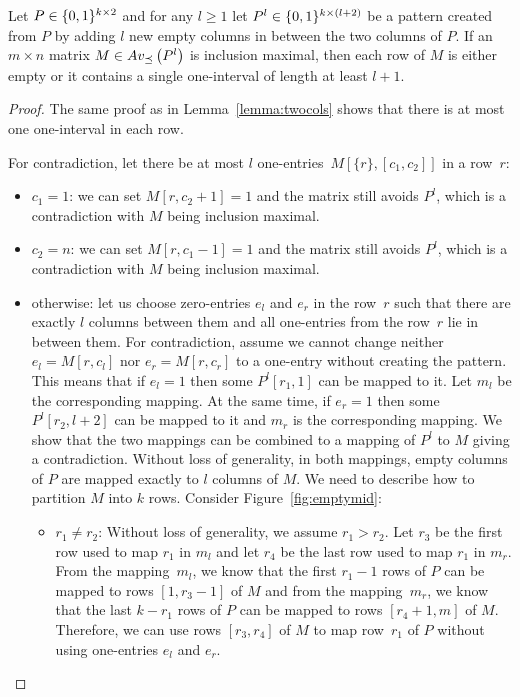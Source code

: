 \begin{lemma}
\label{lemma:maxmult}
Let $P\in\{0,1\}^{k\times2}$ and for any $l\geq1$ let $P^l\in\{0,1\}^{k\times(l+2)}$ be a pattern created from $P$ by adding $l$ new empty columns in between the two columns of $P$. If an $m\times n$ matrix $M\in Av_{\preceq}\left(P^l\right)$ is inclusion maximal, then each row of $M$ is either empty or it contains a single one-interval of length at least $l+1$.
\end{lemma}
\begin{proof}
The same proof as in Lemma~\ref{lemma:twocols} shows that there is at most one one-interval in each row.

For contradiction, let there be at most $l$ one-entries~$M[\{r\},[c_1,c_2]]$ in a row~$r$:
\begin{itemize}
	\item $c_1=1$: we can set $M[r,c_2+1]=1$ and the matrix still avoids $P^l$, which is a contradiction with $M$ being inclusion maximal.
	\item $c_2=n$: we can set $M[r,c_1-1]=1$ and the matrix still avoids $P^l$, which is a contradiction with $M$ being inclusion maximal.
	\item otherwise: let us choose zero-entries $e_l$ and $e_r$ in the row~$r$ such that there are exactly $l$ columns between them and all one-entries from the row~$r$ lie in between them. For contradiction, assume we cannot change neither $e_l=M[r,c_l]$ nor $e_r=M[r,c_r]$ to a one-entry without creating the pattern. This means that if $e_l=1$ then some $P^l[r_1,1]$ can be mapped to it. Let $m_l$ be the corresponding mapping. At the same time, if $e_r=1$ then some $P^l[r_2,l+2]$ can be mapped to it and $m_r$ is the corresponding mapping. We show that the two mappings can be combined to a mapping of $P^l$ to $M$ giving a contradiction. Without loss of generality, in both mappings, empty columns of $P$ are mapped exactly to $l$ columns of $M$. We need to describe how to partition $M$ into $k$ rows. Consider Figure~\ref{fig:emptymid}:
	\begin{itemize}
		\item $r_1\neq r_2$: Without loss of generality, we assume $r_1>r_2$. Let $r_3$ be the first row used to map $r_1$ in $m_l$ and let $r_4$ be the last row used to map $r_1$ in $m_r$. From the mapping~$m_l$, we know that the first $r_1-1$ rows of $P$ can be mapped to rows $[1,r_3-1]$ of $M$ and from the mapping~$m_r$, we know that the last $k-r_1$ rows of $P$ can be mapped to rows $[r_4+1,m]$ of $M$. Therefore, we can use rows $[r_3,r_4]$ of $M$ to map row~$r_1$ of $P$ without using one-entries $e_l$ and $e_r$.

\end{itemize}
\end{itemize}
\end{proof}

